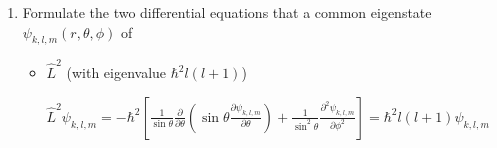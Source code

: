 \documentclass[11pt,a4paper]{scrartcl}
\begin{document}
\begin{enumerate}
\begin{calculationbox}
\begin{calculationbox}
                        $\hat{L}_2 = i \hbar 
                        ( -\cos \phi \frac{\partial}{\partial \theta}
                        + \cot\theta \sin\phi \frac{\partial}{\partial \phi})$

                        $\hat{L}_3 = - i \hbar \frac{\partial}{\partial \phi}$
                    \end{calculationbox}

                    total operator $\hat{L}^2$
                    \begin{calculationbox}
                        $\hat{L}^2 = -\hbar [\frac{1}{\sin\theta} \frac{\partial}{\partial \theta} (\sin\theta \frac{\partial}{\partial \theta}) + \frac{1}{\sin^2 \theta} \frac{\partial^2}{\partial \phi^2}]$
                    \end{calculationbox}
                    \begin{calculationbox}
                        
                    \end{calculationbox}

                    Ladder operator
                    \begin{calculationbox}
                        $\hat{L}_\pm = \hbar e^{\pm i \phi} (\pm\frac{\partial}{\partial \theta} + i \cot\theta \frac{\partial}{\partial\phi})$
                    \end{calculationbox}
                    \begin{calculationbox}
                        
                    \end{calculationbox}
                \end{calculationbox}

            \item 
                Formulate the two differential equations that a common eigenstate $\psi_{k, l, m}(r, \theta, \phi)$ of
                \begin{itemize}
                    \item 
                        $\hat{L}^2$ (with eigenvalue $\hbar^2 l (l + 1)$)
                        \begin{calculationbox}
                            $\hat{L}^2 \psi_{k,l,m} 
                            = -\hbar^2 [\frac{1}{\sin\theta} \frac{\partial}{\partial \theta} (\sin\theta \frac{\partial \psi_{k,l,m}}{\partial \theta}) + \frac{1}{\sin^2 \theta} \frac{\partial^2 \psi_{k,l,m}}{\partial \phi^2}] 
                            = \hbar^2 l (l + 1) \psi_{k,l,m}
                            $


\end{calculationbox}
\end{itemize}
\end{enumerate}
\end{document}
